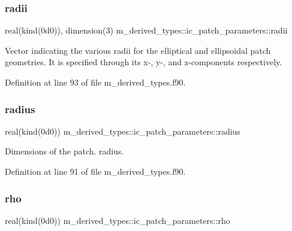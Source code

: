 \subsubsection{\texorpdfstring{radii}{radii}}
{\footnotesize\ttfamily real(kind(0d0)), dimension(3) m\+\_\+derived\+\_\+types\+::ic\+\_\+patch\+\_\+parameters\+::radii}



Vector indicating the various radii for the elliptical and ellipsoidal patch geometries. It is specified through its x-\/, y-\/, and z-\/components respectively. 



Definition at line 93 of file m\+\_\+derived\+\_\+types.\+f90.

\mbox{\label{structm__derived__types_1_1ic__patch__parameters_ac29377a1f4b94223f5ca28e69a863848}} 
\subsubsection{\texorpdfstring{radius}{radius}}
{\footnotesize\ttfamily real(kind(0d0)) m\+\_\+derived\+\_\+types\+::ic\+\_\+patch\+\_\+parameters\+::radius}



Dimensions of the patch. radius. 



Definition at line 91 of file m\+\_\+derived\+\_\+types.\+f90.

\mbox{\label{structm__derived__types_1_1ic__patch__parameters_ac282e81da07bd2bbcb5dbdb4de67e160}} 
\subsubsection{\texorpdfstring{rho}{rho}}
{\footnotesize\ttfamily real(kind(0d0)) m\+\_\+derived\+\_\+types\+::ic\+\_\+patch\+\_\+parameters\+::rho}



